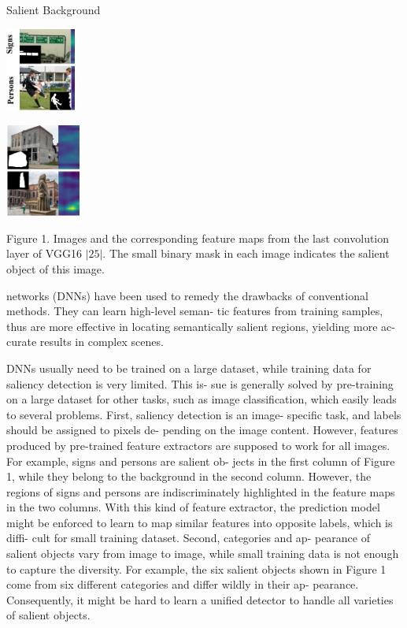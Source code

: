 \documentclass[a4paper,10pt]{article}
\begin{document}
Salient Background
\begin{center}
\includegraphics[width=22.94mm,height=27.43mm]{./zengyu_images/image001.eps}

\includegraphics[width=24.72mm,height=30.52mm]{./zengyu_images/image002.eps}
\end{center}
Figure 1. Images and the corresponding feature maps from the last convolution layer of VGG16 $|25|$. The small binary mask in each image indicates the salient object of this image.

networks (DNNs) have been used to remedy the drawbacks of conventional methods. They can learn high-level seman- tic features from training samples, thus are more effective in locating semantically salient regions, yielding more ac- curate results in complex scenes.

DNNs usually need to be trained on a large dataset, while training data for saliency detection is very limited. This is- sue is generally solved by pre-training on a large dataset for other tasks, such as image classification, which easily leads to several problems. First, saliency detection is an image- specific task, and labels should be assigned to pixels de- pending on the image content. However, features produced by pre-trained feature extractors are supposed to work for all images. For example, signs and persons are salient ob- jects in the first column of Figure 1, while they belong to the background in the second column. However, the regions of signs and persons are indiscriminately highlighted in the feature maps in the two columns. With this kind of feature extractor, the prediction model might be enforced to learn to map similar features into opposite labels, which is diffi- cult for small training dataset. Second, categories and ap- pearance of salient objects vary from image to image, while small training data is not enough to capture the diversity. For example, the six salient objects shown in Figure 1 come from six different categories and differ wildly in their ap- pearance. Consequently, it might be hard to learn a unified detector to handle all varieties of salient objects.
\end{document}
